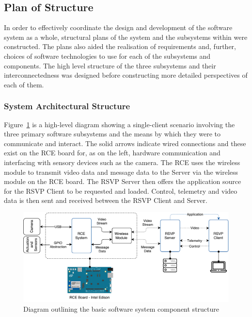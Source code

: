   \subsection{Plan of Structure}
    In order to effectively coordinate the design and development of the software system as a whole, structural plans of the system and the subsystems within were constructed. The plans also aided the realisation of requirements and, further, choices of software technologies to use for each of the subsystems and components. The high level structure of the three subsystems and their interconnectedness was designed before constructing more detailed perspectives of each of them.
    
    \subsubsection{System Architectural Structure}            
      Figure~\ref{fig:softDesign-sysArchitectureStructure} is a high-level diagram showing a single-client scenario involving the three primary software subsystems and the means by which they were to communicate and interact. The solid arrows indicate wired connections and these exist on the RCE board for, as on the left, hardware communication and interfacing with sensory devices such as the camera. The RCE uses the wireless module to transmit video data and message data to the Server via the wireless module on the RCE board. The RSVP Server then offers the application source for the RSVP Client to be requested and loaded. Control, telemetry and video data is then sent and received between the RSVP Client and Server.

      \begin{figure}[h!]
        \centering
        \includegraphics[width=1\linewidth]{figures/softDesign-sysArchitectureStructure}
        \caption[Diagram outlining the basic software system component structure]{Diagram outlining the basic software system component structure}
        \label{fig:softDesign-sysArchitectureStructure}
      \end{figure}
      
